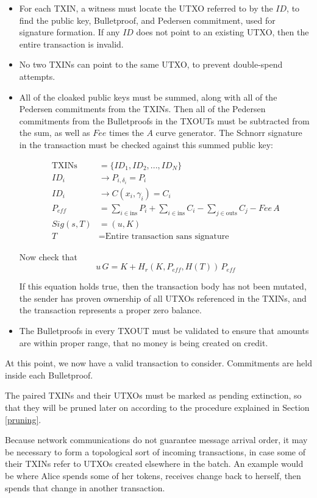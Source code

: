 \documentclass[a4paper, 10pt, conference]{ieeeconf}
\begin{document}
\begin{itemize}
	\item{For each TXIN, a witness must locate the UTXO referred to by the $ID$, to find the public key, Bulletproof, and Pedersen commitment, used for signature formation. If any $ID$ does not point to an existing UTXO, then the entire transaction is invalid.}
	\item{No two TXINs can point to the same UTXO, to prevent double-spend attempts.}
	\item{All of the cloaked public keys must be summed, along with all of the Pedersen commitments from the TXINs. Then all of the Pedersen commitments from the Bulletproofs in the TXOUTs must be subtracted from the sum, as well as $Fee$ times the $A$ curve generator. The Schnorr signature in the transaction must be checked against this summed public key:

	\begin{align*}
		\text{TXINs} &= \{ID_1, ID_2, ..., ID_N\} \\
		ID_i &\rightarrow P_{i, \delta_i} = P_i\\
		ID_i &\rightarrow C(x_i, \gamma_i) = C_i\\
		P_{eff} &= \sum_{i \in \text{ins}}{P_i} + \sum_{i \in \text{ins}}{C_i}  - \sum_{j \in \text{outs}}{C_j} - Fee\,A\\
		Sig(s, T) &= (u, K)\\
		T &= \text{Entire transaction sans signature}
	\end{align*}

	Now check that
	$$u \, G = K + H_r(K, P_{eff}, H(T)) \, P_{eff}$$
	
	If this equation holds true, then the transaction body has not been mutated, the sender has proven ownership of all UTXOs referenced in the TXINs, and the transaction represents a proper zero balance.}
	\item{The Bulletproofs in every TXOUT must be validated to ensure that amounts are within proper range, that no money is being created on credit.}
\end{itemize}

At this point, we now have a valid transaction to consider. Commitments are held inside each Bulletproof.

The paired TXINs and their UTXOs must be marked as pending extinction, so that they will be pruned later on according to the procedure explained in Section \ref{pruning}.

Because network communications do not guarantee message arrival order, it may be necessary to form a topological sort of incoming transactions, in case some of their TXINs refer to UTXOs created elsewhere in the batch. An example would be where Alice spends some of her tokens, receives change back to herself, then spends that change in another transaction.
\end{document}
